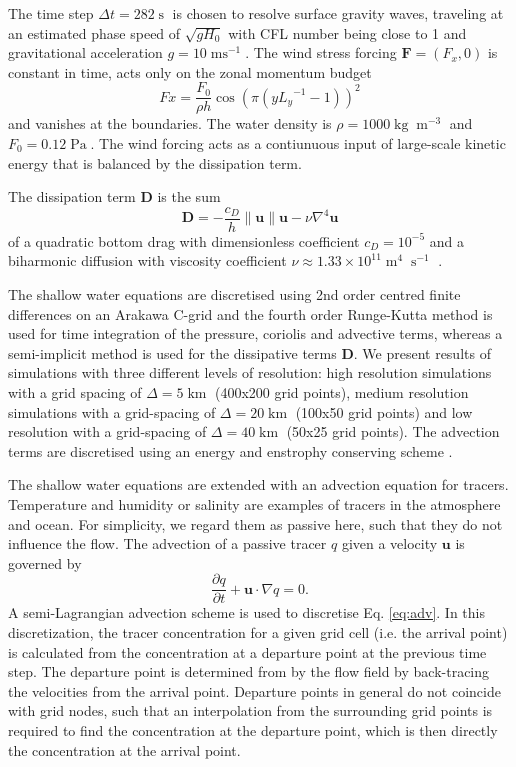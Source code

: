 \documentclass[draft]{agujournal2019}
\newcommand{\op}{\operatorname}
\begin{document}
The time step $\Delta t = 282\op{s}$ is chosen to resolve surface gravity waves,
traveling at an estimated phase speed of $\sqrt{gH_0}$ with CFL number being
close to 1 and gravitational acceleration $g=10\op{ms}^{-1}$. The wind stress
forcing $\mathbf{F} = (F_x,0)$ is constant in time, acts only on the zonal momentum
budget
\begin{equation}
Fx = \frac{F_0}{\rho h} \cos\left(\pi\left(y{L_y}^{-1} - 1\right)\right)^2
\end{equation}
and vanishes at the boundaries. The water density is $\rho = 1000\op{kg}\op{m}^{-3}$
and $F_0 = 0.12\op{Pa}$. The wind forcing acts as a contiunuous input of large-scale
kinetic energy that is balanced by the dissipation term.

The dissipation term $\mathbf{D}$ is the sum
\begin{equation}
\mathbf{D} = -\frac{c_D}{h}\| \mathbf{u} \| \mathbf{u} - \nu \nabla^4 \mathbf{u}
\label{eq:diss}
\end{equation}
of a quadratic bottom drag with dimensionless coefficient $c_D = 10^{-5}$ \cite{Arbic2008}
and a biharmonic diffusion with viscosity coefficient $\nu \approx 1.33\times10^{11} \op{m}^4\op{s}^{-1}$ \cite{Griffies2000}.

The shallow water equations are discretised using 2nd order centred finite differences
on an Arakawa C-grid \cite{Arakawa1977} and the fourth order Runge-Kutta method \cite{Butcher2016}
is used for time integration of the pressure, coriolis and advective terms, whereas a
semi-implicit method is used for the dissipative terms $\mathbf{D}$. We present results
of simulations with three different levels of resolution: high resolution simulations
with a grid spacing of $\Delta = 5\operatorname{km}$ (400x200 grid points), medium
resolution simulations with a grid-spacing of $\Delta = 20\operatorname{km}$
(100x50 grid points) and low resolution with a grid-spacing of $\Delta = 40\operatorname{km}$
(50x25 grid points). The advection terms are discretised using an energy and
enstrophy conserving scheme \cite{Arakawa1990}.

The shallow water equations are extended with an advection equation for tracers.
Temperature and humidity or salinity are examples of tracers in the atmosphere
and ocean. For simplicity, we regard them as passive here, such that they do not
influence the flow. The advection of a passive tracer $q$ given a velocity $\mathbf{u}$
is governed by
\begin{equation}
\frac{\partial q}{\partial t} + \mathbf{u} \cdot \nabla q = 0.
\label{eq:adv}
\end{equation}
A semi-Lagrangian advection scheme \cite{Smolarkiewicz1992} is used to discretise
Eq. \ref{eq:adv}. In this discretization, the tracer concentration for a given grid cell
(i.e. the arrival point) is calculated from the concentration at a departure point
at the previous time step. The departure point is determined from by the flow field
by back-tracing the velocities from the arrival point. Departure points in general
do not coincide with grid nodes, such that an interpolation from the surrounding grid
points is required to find the concentration at the departure point, which is then
directly the concentration at the arrival point.
\end{document}
